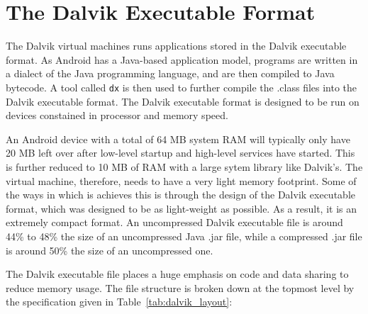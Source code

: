 \section{The Dalvik Executable Format}
\label{sec:dex}

The Dalvik virtual machines runs applications stored in the Dalvik executable format. As Android has a Java-based application model, programs are written in a dialect of the Java programming language, and are then compiled to Java bytecode. A tool called \verb|dx| is then used to further compile the .class files into the Dalvik executable format. The Dalvik executable format is designed to be run on devices constained in processor and memory speed.

An Android device with a total of 64 MB system RAM will typically only have 20 MB left over after low-level startup and high-level services have started. This is further reduced to 10 MB of RAM with a large sytem library like Dalvik's\cite{dalvik_int}. The virtual machine, therefore, needs to have a very light memory footprint. Some of the ways in which is achieves this is through the design of the Dalvik executable format, which was designed to be as light-weight as possible. As a result, it is an extremely compact format. An uncompressed Dalvik executable file is around 44\% to 48\% the size of an uncompressed Java .jar file, while a compressed .jar file is around 50\% the size of an uncompressed one\cite{dalvik_int}.

The Dalvik executable file places a huge emphasis on code and data sharing to reduce memory usage. The file structure is broken down at the topmost level by the specification given in Table~\ref{tab:dalvik_layout}:

